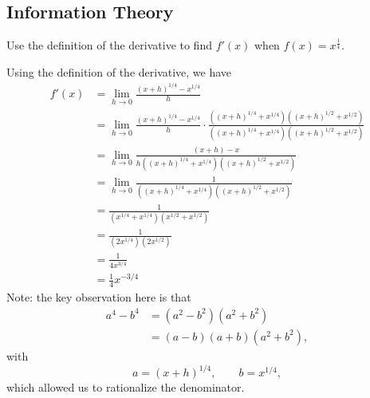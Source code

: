 \documentclass{article}
\begin{document}
\subsection*{Information Theory}
Use the definition of the derivative to find $f'(x)$ when $f(x)=x^{\frac{1}{4}}$.

Using the definition of the derivative, we have
\begin{align*}
            f'(x)           &= \lim_{h\rightarrow 0}\frac{(x+h)^{1/4}-x^{1/4}}{h}   \\
                            &=  \lim_{h\rightarrow 0}\frac{(x+h)^{1/4}-x^{1/4}}{h}\cdot \frac{((x+h)^{1/4}+x^{1/4})((x+h)^{1/2}+x^{1/2})}{((x+h)^{1/4}+x^{1/4})((x+h)^{1/2}+x^{1/2})}\\
                            &=  \lim_{h\rightarrow 0}\frac{(x+h)-x}{h((x+h)^{1/4}+x^{1/4})((x+h)^{1/2}+x^{1/2})}    \\  
                            &=  \lim_{h\rightarrow 0}\frac{1}{((x+h)^{1/4}+x^{1/4})((x+h)^{1/2}+x^{1/2})}   \\
                            &= \frac{1}{(x^{1/4}+x^{1/4})(x^{1/2}+x^{1/2})} \\
                            &=  \frac{1}{(2x^{1/4})(2x^{1/2})}  \\
                            &=  \frac{1}{4x^{3/4}}  \\
                            &=  \frac{1}{4}x^{-3/4}
\end{align*}
Note: the key observation here is that
\begin{align*}
    a^4-b^4 &= (a^2-b^2)(a^2+b^2)   \\
        &= (a-b)(a+b)(a^2+b^2), 
\end{align*}
with 
\[
    a = (x+h)^{1/4}, \qquad b = x^{1/4},
\]
which allowed us to rationalize the denominator.
\end{document}
